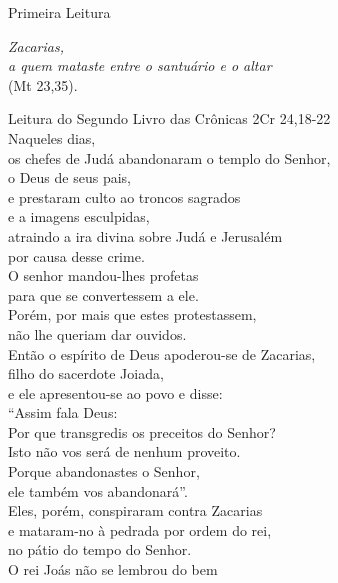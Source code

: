 \documentclass{book}
\begin{document}
\pagestyle{empty}
\begin{center}
    \textcolor{VioletRed1}{Primeira Leitura}
\end{center}
\begin{flushright}
    \textit{Zacarias,\\ a quem mataste entre o santuário e o altar}\\ \textcolor{VioletRed1}{(Mt 23,35).}
\end{flushright}
\begin{flushleft}
    \vspace{.2cm}
    Leitura do Segundo Livro das Crônicas
    \hspace{\fill}
    \textcolor{VioletRed1}{2Cr 24,18-22}
    \vspace{.2cm}\\
    Naqueles dias,\\
    os chefes de Judá abandonaram o templo do Senhor,\\
    o Deus de seus pais,\\
    e prestaram culto ao troncos sagrados\\
    e a imagens esculpidas,\\
    atraindo a ira divina sobre Judá e Jerusalém\\
    por causa desse crime.\\
    O senhor mandou-lhes profetas\\
    para que se convertessem a ele.\\
    Porém, por mais que estes protestassem,\\
    não lhe queriam dar ouvidos.\\
    Então o espírito de Deus apoderou-se de Zacarias,\\
    filho do sacerdote Joiada,\\
    e ele apresentou-se ao povo e disse:\\
    ``Assim fala Deus:\\
    Por que transgredis os preceitos do Senhor?\\
    Isto não vos será de nenhum proveito.\\
    Porque abandonastes o Senhor,\\
    ele também vos abandonará''.\\
    Eles, porém, conspiraram contra Zacarias\\
    e mataram-no à pedrada por ordem do rei,\\
    no pátio do tempo do Senhor.\\
    O rei Joás não se lembrou do bem\\

\end{flushleft}
\end{document}

